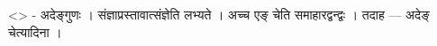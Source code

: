 \textless{}\textgreater{} - अदेङ्गुणः । संज्ञाप्रस्तावात्संज्ञेति लभ्यते
। अच्च एङ् चेति समाहारद्वन्द्वः । तदाह --- अदेङ् चेत्यादिना ।
